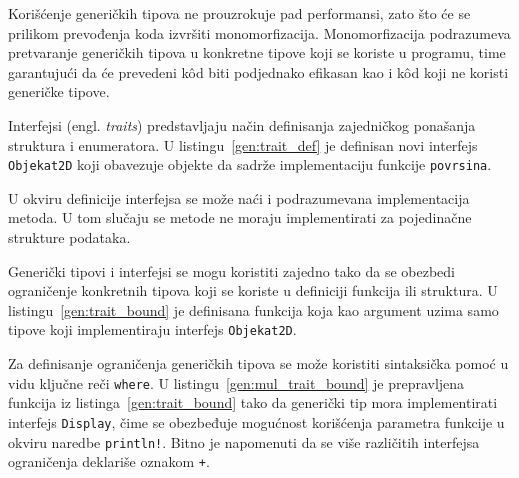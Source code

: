 \documentclass[12pt,oneside]{memoir}
\begin{document}


Korišćenje generičkih tipova ne prouzrokuje pad performansi, zato što će
se prilikom prevođenja koda izvršiti monomorfizacija. Monomorfizacija
podrazumeva pretvaranje generičkih tipova u konkretne tipove koji se koriste u
programu, time garantujući da će prevedeni kôd biti podjednako efikasan kao
i kôd koji ne koristi generičke tipove.

Interfejsi (engl. \emph{traits}) predstavljaju način definisanja zajedničkog ponašanja
struktura i enumeratora. U listingu~\ref{gen:trait_def} je definisan novi
interfejs \texttt{Objekat2D} koji obavezuje objekte da sadrže implementaciju
funkcije \texttt{povrsina}.



U okviru definicije interfejsa se može naći i podrazumevana implementacija metoda.
U tom slučaju se metode ne moraju implementirati za pojedinačne strukture podataka.

Generički tipovi i interfejsi se mogu koristiti zajedno tako da se obezbedi ograničenje
konkretnih tipova koji se koriste u definiciji funkcija ili struktura. U
listingu~\ref{gen:trait_bound} je definisana funkcija koja kao argument uzima samo
tipove koji implementiraju interfejs \texttt{Objekat2D}.



Za definisanje ograničenja generičkih tipova se može koristiti sintaksička pomoć u
vidu ključne reči \texttt{where}. U listingu~\ref{gen:mul_trait_bound} je prepravljena
funkcija iz listinga~\ref{gen:trait_bound} tako da generički tip mora implementirati
interfejs \texttt{Display}, čime se obezbeđuje mogućnost korišćenja parametra funkcije
u okviru naredbe \texttt{println!}. Bitno je napomenuti da se više različitih interfejsa
ograničenja deklariše oznakom \texttt{+}.


\end{document}
